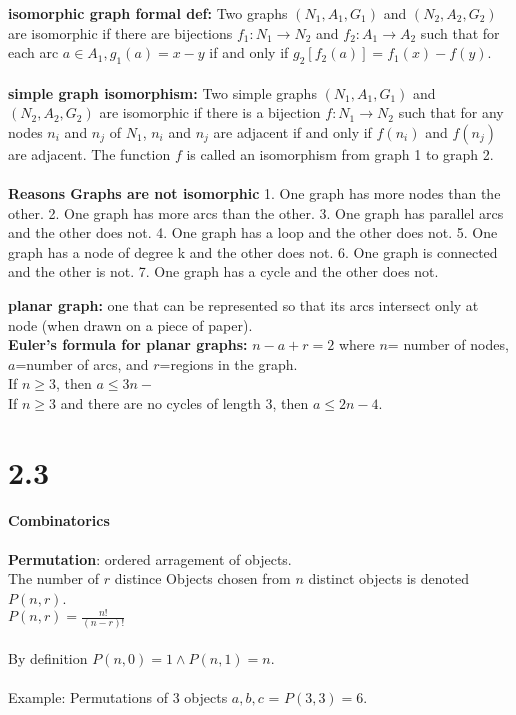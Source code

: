 \documentclass[14pt]{extreport}
\begin{document}
\textbf{isomorphic graph formal def:} Two graphs $(N_1,A_1,G_1)$ and $(N_2,A_2,G_2)$ are isomorphic if there are bijections $f_1: N_1 \to N_2$ and $f_2: A_1 \to A_2$
such that for each arc $a \in A_1, g_1(a)=x-y$ if and only if $g_2[f_2(a)]=f_1(x)-f(y)$.\\
\\
\textbf{simple graph isomorphism:} Two simple graphs $(N_1,A_1,G_1)$ and $(N_2,A_2,G_2)$ are isomorphic if there is a bijection $f:N_1 \to N_2$ such that for any
nodes $n_i$ and $n_j$ of $N_1$, $n_i$ and $n_j$ are adjacent if and only if $f(n_i)$ and $f(n_j)$ are adjacent. The function $f$ is called an isomorphism from graph 1 to graph 2.\\
\\
\textbf{Reasons Graphs are not isomorphic}
1. One graph has more nodes than the other.
2. One graph has more arcs than the other.
3. One graph has parallel arcs and the other does not.
4. One graph has a loop and the other does not.
5. One graph has a node of degree k and the other does not.
6. One graph is connected and the other is not.
7. One graph has a cycle and the other does not.

\textbf{planar graph:} one that can be represented so that its arcs intersect only at node (when drawn on a piece of paper).\\

\textbf{Euler's formula for planar graphs:} $n-a+r=2$ where $n$= number of nodes, $a$=number of arcs, and $r$=regions in the graph.\\
If $n \ge 3$, then $a \le 3n -$\\
If $n \ge 3$ and there are no cycles of length $3$, then $a \le 2n -4$.\\
\section{2.3} \textbf{Combinatorics}\\
\\
\textbf{Permutation}: ordered arragement of objects.\\
The number of $r$ distince Objects chosen from $n$ distinct objects is denoted $P(n,r)$.\\
$P(n,r) = \frac{n!}{(n-r)!}$\\
\\
By definition $P(n,0)=1 \land P(n,1)=n$.\\
\\
Example: Permutations of 3 objects $a,b,c$ = $P(3,3)=6$.\\
\\
\end{document}
